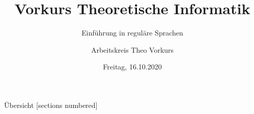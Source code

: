 

\title{Vorkurs Theoretische Informatik}
\subtitle{Einführung in reguläre Sprachen}
\date{Freitag, 16.10.2020}
\author{Arbeitskreis  Theo Vorkurs}



\maketitle

\begin{frame}[fragile]{Übersicht}
  [sections numbered]
  \tableofcontents%
\end{frame}


